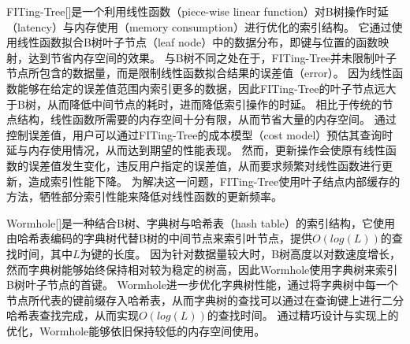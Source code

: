 
FITing-Tree[]是一个利用线性函数（piece-wise linear function）对B树操作时延（latency）与内存使用（memory consumption）进行优化的索引结构。
它通过使用线性函数拟合B树叶子节点（leaf node）中的数据分布，即键与位置的函数映射，达到节省内存空间的效果。
与B树不同之处在于，FITing-Tree并未限制叶子节点所包含的数据量，而是限制线性函数拟合结果的误差值（error）。
因为线性函数能够在给定的误差值范围内索引更多的数据，因此FITing-Tree的叶子节点远大于B树，从而降低中间节点的耗时，进而降低索引操作的时延。
相比于传统的节点结构，线性函数所需要的内存空间十分有限，从而节省大量的内存空间。
通过控制误差值，用户可以通过FITing-Tree的成本模型（cost model）预估其查询时延与内存使用情况，从而达到期望的性能表现。
然而，更新操作会使原有线性函数的误差值发生变化，违反用户指定的误差值，从而要求频繁对线性函数进行更新，造成索引性能下降。
为解决这一问题，FITing-Tree使用叶子结点内部缓存的方法，牺牲部分索引性能来降低对线性函数的更新频率。


Wormhole[]是一种结合B树、字典树与哈希表（hash table）的索引结构，它使用由哈希表编码的字典树代替B树的中间节点来索引叶节点，提供$O(log(L))$的查找时间，其中$L$为键的长度。
因为针对数据量较大时，B树高度以对数速度增长，然而字典树能够始终保持相对较为稳定的树高，因此Wormhole使用字典树来索引B树叶子节点的首键。
Wormhole进一步优化字典树性能，通过将字典树中每一个节点所代表的键前缀存入哈希表，从而字典树的查找可以通过在查询键上进行二分哈希表查找完成，从而实现$O(log(L))$的查找时间。
通过精巧设计与实现上的优化，Wormhole能够依旧保持较低的内存空间使用。


